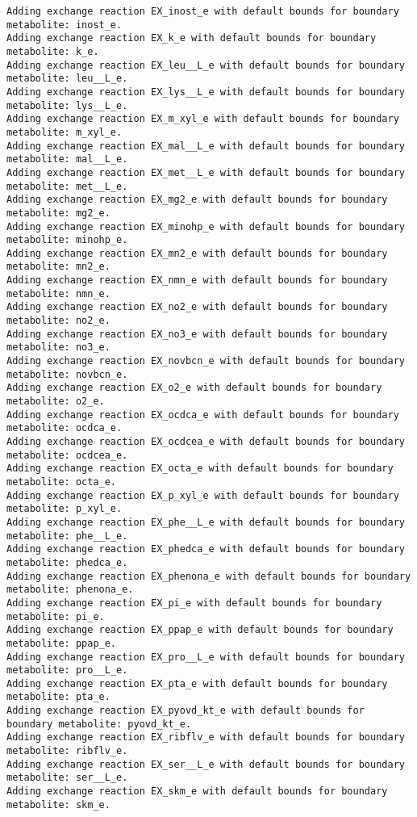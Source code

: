 \documentclass[
  letterpaper,
  DIV=11,
  numbers=noendperiod]{scrartcl}
\begin{document}
\begin{verbatim}
Adding exchange reaction EX_inost_e with default bounds for boundary metabolite: inost_e.
Adding exchange reaction EX_k_e with default bounds for boundary metabolite: k_e.
Adding exchange reaction EX_leu__L_e with default bounds for boundary metabolite: leu__L_e.
Adding exchange reaction EX_lys__L_e with default bounds for boundary metabolite: lys__L_e.
Adding exchange reaction EX_m_xyl_e with default bounds for boundary metabolite: m_xyl_e.
Adding exchange reaction EX_mal__L_e with default bounds for boundary metabolite: mal__L_e.
Adding exchange reaction EX_met__L_e with default bounds for boundary metabolite: met__L_e.
Adding exchange reaction EX_mg2_e with default bounds for boundary metabolite: mg2_e.
Adding exchange reaction EX_minohp_e with default bounds for boundary metabolite: minohp_e.
Adding exchange reaction EX_mn2_e with default bounds for boundary metabolite: mn2_e.
Adding exchange reaction EX_nmn_e with default bounds for boundary metabolite: nmn_e.
Adding exchange reaction EX_no2_e with default bounds for boundary metabolite: no2_e.
Adding exchange reaction EX_no3_e with default bounds for boundary metabolite: no3_e.
Adding exchange reaction EX_novbcn_e with default bounds for boundary metabolite: novbcn_e.
Adding exchange reaction EX_o2_e with default bounds for boundary metabolite: o2_e.
Adding exchange reaction EX_ocdca_e with default bounds for boundary metabolite: ocdca_e.
Adding exchange reaction EX_ocdcea_e with default bounds for boundary metabolite: ocdcea_e.
Adding exchange reaction EX_octa_e with default bounds for boundary metabolite: octa_e.
Adding exchange reaction EX_p_xyl_e with default bounds for boundary metabolite: p_xyl_e.
Adding exchange reaction EX_phe__L_e with default bounds for boundary metabolite: phe__L_e.
Adding exchange reaction EX_phedca_e with default bounds for boundary metabolite: phedca_e.
Adding exchange reaction EX_phenona_e with default bounds for boundary metabolite: phenona_e.
Adding exchange reaction EX_pi_e with default bounds for boundary metabolite: pi_e.
Adding exchange reaction EX_ppap_e with default bounds for boundary metabolite: ppap_e.
Adding exchange reaction EX_pro__L_e with default bounds for boundary metabolite: pro__L_e.
Adding exchange reaction EX_pta_e with default bounds for boundary metabolite: pta_e.
Adding exchange reaction EX_pyovd_kt_e with default bounds for boundary metabolite: pyovd_kt_e.
Adding exchange reaction EX_ribflv_e with default bounds for boundary metabolite: ribflv_e.
Adding exchange reaction EX_ser__L_e with default bounds for boundary metabolite: ser__L_e.
Adding exchange reaction EX_skm_e with default bounds for boundary metabolite: skm_e.

\end{verbatim}
\end{document}
